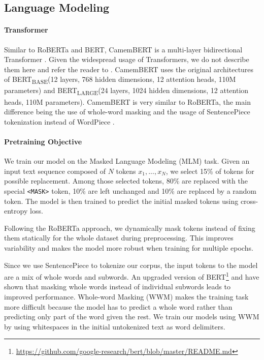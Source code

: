 \documentclass[11pt,a4paper]{article}
\newcommand{\camembert}{CamemBERT\xspace}
\newcommand{\roberta}{RoBERTa\xspace}
\newcommand{\bert}{BERT\xspace}
\newcommand{\bertbase}{BERT\textsubscript{BASE}\xspace}
\newcommand{\bertlarge}{BERT\textsubscript{LARGE}\xspace}
\begin{document}
\subsection{Language Modeling}

\paragraph{Transformer}
Similar to \roberta and \bert, \camembert is a multi-layer bidirectional Transformer \cite{vaswani2017attention}. Given the widespread usage of Transformers, we do not describe them here and refer the reader to \citep{vaswani2017attention}.
\camembert uses the original architectures of \bertbase (12 layers, 768 hidden dimensions, 12 attention heads, 110M parameters) and \bertlarge (24 layers, 1024 hidden dimensions, 12 attention heads, 110M parameters).
\camembert is very similar to \roberta, the main difference being the use of whole-word masking and the usage of SentencePiece tokenization \cite{kudo2018sentencepiece} instead of WordPiece \cite{schuster2012japanese}.

\paragraph{Pretraining Objective}
We train our model on the Masked Language Modeling (MLM) task.
Given an input text sequence composed of $N$ tokens $x_1, ..., x_N$, we select 15\% of tokens for possible replacement. Among those selected tokens, 80\% are replaced with the special \texttt{<MASK>} token, 10\% are left unchanged and 10\% are replaced by a random token. The model is then trained to predict the initial masked tokens using cross-entropy loss.

Following the \roberta approach, we dynamically mask tokens instead of fixing them statically for the whole dataset during preprocessing. This improves variability and makes the model more robust when training for multiple epochs.

Since we use SentencePiece to tokenize our corpus, the input tokens to the model are a mix of whole words and subwords.
An upgraded version of \bert\footnote{\url{https://github.com/google-research/bert/blob/master/README.md}} and \citet{joshi2019spanbert} have shown that masking whole words instead of individual subwords leads to improved performance.
Whole-word Masking (WWM) makes the training task more difficult because the model has to predict a whole word rather than predicting only part of the word given the rest.
We train our models using WWM by using whitespaces in the initial untokenized text as word delimiters.
\end{document}
